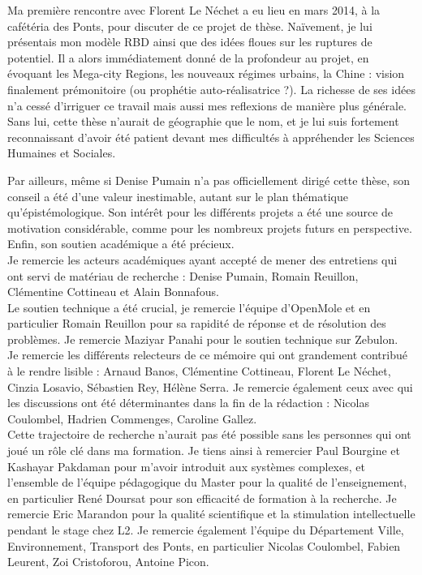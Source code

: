 Ma première rencontre avec Florent Le Néchet a eu lieu en mars 2014, à la cafétéria des Ponts, pour discuter de ce projet de thèse. Naïvement, je lui présentais mon modèle RBD ainsi que des idées floues sur les ruptures de potentiel. Il a alors immédiatement donné de la profondeur au projet, en évoquant les Mega-city Regions, les nouveaux régimes urbains, la Chine : vision finalement prémonitoire (ou prophétie auto-réalisatrice ?). La richesse de ses idées n'a cessé d'irriguer ce travail mais aussi mes reflexions de manière plus générale. Sans lui, cette thèse n'aurait de géographie que le nom, et je lui suis fortement reconnaissant d'avoir été patient devant mes difficultés à appréhender les Sciences Humaines et Sociales.

Par ailleurs, même si Denise Pumain n'a pas officiellement dirigé cette thèse, son conseil a été d'une valeur inestimable, autant sur le plan thématique qu'épistémologique. Son intérêt pour les différents projets a été une source de motivation considérable, comme pour les nombreux projets futurs en perspective. Enfin, son soutien académique a été précieux.
\\


Je remercie les acteurs académiques ayant accepté de mener des entretiens qui ont servi de matériau de recherche : Denise Pumain, Romain Reuillon, Clémentine Cottineau et Alain Bonnafous.\\


Le soutien technique a été crucial, je remercie l'équipe d'OpenMole et en particulier Romain Reuillon pour sa rapidité de réponse et de résolution des problèmes. Je remercie Maziyar Panahi pour le soutien technique sur Zebulon.\\

Je remercie les différents relecteurs de ce mémoire qui ont grandement contribué à le rendre lisible : Arnaud Banos, Clémentine Cottineau, Florent Le Néchet, Cinzia Losavio, Sébastien Rey, Hélène Serra. Je remercie également ceux avec qui les discussions ont été déterminantes dans la fin de la rédaction : Nicolas Coulombel, Hadrien Commenges, Caroline Gallez.\\



Cette trajectoire de recherche n'aurait pas été possible sans les personnes qui ont joué un rôle clé dans ma formation. Je tiens ainsi à remercier Paul Bourgine et Kashayar Pakdaman pour m'avoir introduit aux systèmes complexes, et l'ensemble de l'équipe pédagogique du Master pour la qualité de l'enseignement, en particulier René Doursat pour son efficacité de formation à la recherche. Je remercie Eric Marandon pour la qualité scientifique et la stimulation intellectuelle pendant le stage chez L2. Je remercie également l'équipe du Département Ville, Environnement, Transport des Ponts, en particulier Nicolas Coulombel, Fabien Leurent, Zoi Cristoforou, Antoine Picon. %

